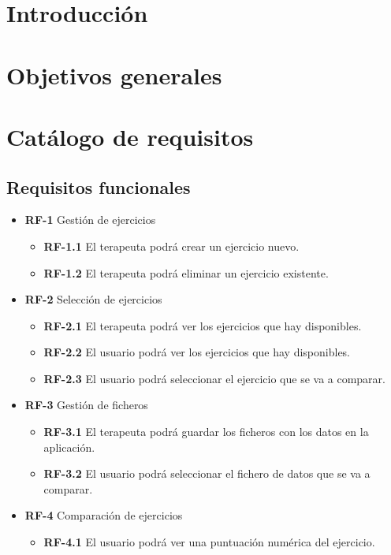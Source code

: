 
\section{Introducción}

\section{Objetivos generales}

\section{Catálogo de requisitos}
\subsection{Requisitos funcionales}
\begin{itemize}
		\item \textbf{RF-1} Gestión de ejercicios
	\begin{itemize}
		\item \textbf{RF-1.1}  El terapeuta podrá crear un ejercicio nuevo.
		\item \textbf{RF-1.2} El terapeuta podrá eliminar un ejercicio existente.
	\end{itemize}
	\item \textbf{RF-2} Selección de ejercicios
	\begin{itemize}
		\item \textbf{RF-2.1}  El terapeuta podrá ver los ejercicios que hay disponibles.
		\item \textbf{RF-2.2} El usuario podrá ver los ejercicios que hay disponibles.
		\item \textbf{RF-2.3} El usuario podrá seleccionar el ejercicio que se va a comparar.
	\end{itemize}
	\item \textbf{RF-3} Gestión de ficheros
	\begin{itemize}
		\item \textbf{RF-3.1}  El terapeuta podrá guardar los ficheros con los datos en la aplicación.
		\item \textbf{RF-3.2} El usuario podrá seleccionar el fichero de datos que se va a comparar.
	\end{itemize}
	\item \textbf{RF-4} Comparación de ejercicios 
	\begin{itemize} 
		\item \textbf{RF-4.1}  El usuario podrá ver una puntuación numérica del ejercicio.
	\end{itemize}
\end{itemize}
